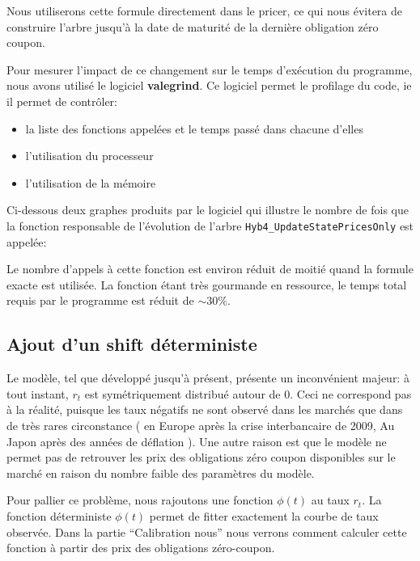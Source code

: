 Nous utiliserons cette formule directement dans le pricer, ce qui nous évitera de construire l'arbre jusqu'à la date de maturité de la dernière obligation zéro coupon.

Pour mesurer l'impact de ce changement sur le temps d'exécution du programme, nous avons utilisé le logiciel \textbf{valegrind}. Ce logiciel  permet le profilage du code, ie il permet de contrôler:
\begin{itemize}
\item la liste des fonctions appelées et le temps passé dans chacune d'elles
\item l'utilisation du processeur
\item l'utilisation de la mémoire
\end{itemize}

Ci-dessous deux graphes produits par le logiciel qui illustre le nombre de fois que la fonction responsable de l'évolution de l'arbre \texttt{Hyb4_UpdateStatePricesOnly} est appelée:


Le nombre d'appels à cette fonction est environ réduit de moitié quand la formule exacte est utilisée. La fonction étant très gourmande en ressource, le temps total requis par le programme est réduit de $\sim30\%$.

\subsection{Ajout d'un shift déterministe}
Le modèle, tel que développé jusqu'à présent, présente un inconvénient majeur: à tout instant, $r_t$ est symétriquement distribué autour de $0$. Ceci ne correspond pas à la réalité, puisque les taux négatifs ne sont observé dans les marchés que dans de très rares circonstance ( en Europe après la crise interbancaire de 2009, Au Japon après des années de déflation ). Une autre raison est que le modèle ne permet pas de retrouver les prix des obligations zéro coupon disponibles sur le marché en raison du nombre faible des paramètres du modèle.

Pour pallier ce problème, nous rajoutons une fonction $\phi(t)$ au taux $r_t$. La fonction déterministe $\phi(t)$ permet de fitter exactement la courbe de taux observée. Dans la partie ``Calibration nous'' nous verrons comment calculer cette fonction à partir des prix des obligations zéro-coupon.

